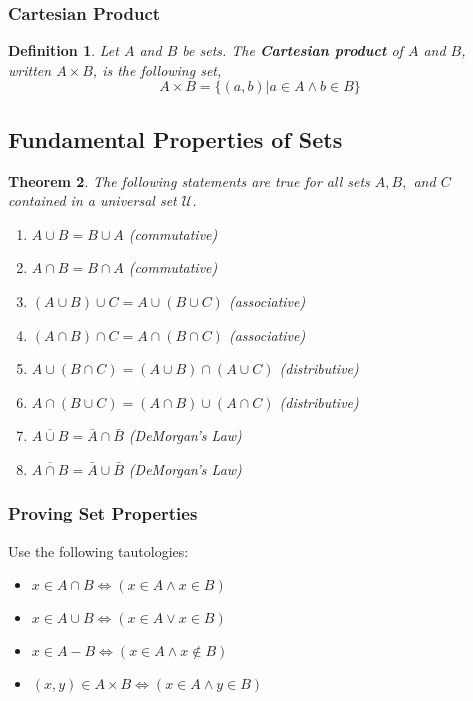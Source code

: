 \documentclass[10pt,reqno]{book}
\theoremstyle{plain}
\newtheorem{theorem}{Theorem}[section]
\newtheorem{definition}[theorem]{Definition}
\def\U{\mathcal{U}}
\begin{document}
	
	\subsubsection*{Cartesian Product}
	
	\begin{definition}
		Let $ A $ and $ B $ be sets. The \textbf{Cartesian product} of $ A $ and $ B $, written $ A \times B $, is the following set,
		\[ A \times B = \{ (a,b) | a \in A \wedge b \in B \} \]
	\end{definition}

	\subsection*{Fundamental Properties of Sets}
	
	\begin{theorem}
		The following statements are true for all sets $ A,B, $ and $ C $ contained in a universal set $ \U $.
		\begin{enumerate}
			\item $ A \cup B = B \cup A $ (commutative)
			\item $ A \cap B = B \cap A $ (commutative)
			\item $ (A \cup B) \cup C = A \cup (B \cup C) $ (associative)
			\item $ (A \cap B) \cap C = A \cap (B \cap C) $ (associative)
			\item $ A \cup (B \cap C) = (A \cup B) \cap (A \cup C) $ (distributive)
			\item $ A \cap (B \cup C) = (A \cap B) \cup (A \cap C) $ (distributive)
			\item $ \overline{A \cup B} = \bar{A} \cap \bar{B} $ (DeMorgan's Law)
			\item $ \overline{A \cap B} = \bar{A} \cup \bar{B} $ (DeMorgan's Law)
		\end{enumerate}
	\end{theorem}

	\subsubsection*{Proving Set Properties}
	
	Use the following tautologies:
	
	\begin{itemize}
		\item $ x \in A \cap B \Leftrightarrow (x \in A \wedge x \in B) $
		\item $ x \in A \cup B \Leftrightarrow (x \in A \vee x \in B) $
		\item $ x \in A - B \Leftrightarrow (x \in A \wedge x \notin B) $
		\item $ (x,y) \in A \times B \Leftrightarrow (x \in A \wedge y \in B) $
	\end{itemize}
\end{document}
